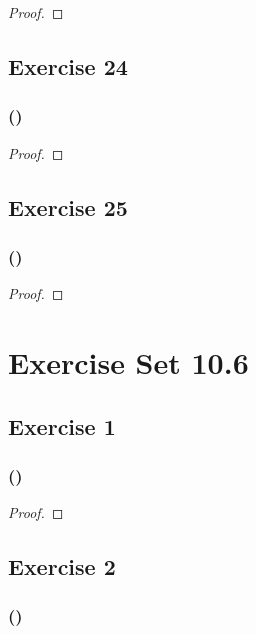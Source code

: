 \documentclass[14pt]{extarticle}
\begin{document}
\begin{proof}

\end{proof}

\subsection{Exercise 24}

\subsubsection{()}

\begin{proof}

\end{proof}

\subsection{Exercise 25}

\subsubsection{()}

\begin{proof}

\end{proof}

\section{Exercise Set 10.6}
\subsection{Exercise 1}

\subsubsection{()}

\begin{proof}

\end{proof}

\subsection{Exercise 2}

\subsubsection{()}
\end{document}
